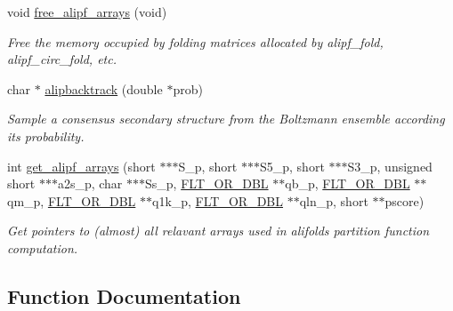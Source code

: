 \begin{DoxyCompactItemize}
void \mbox{\hyperlink{group__part__func__global__deprecated_ga0c0498f35686e26b38ee460d3db1a661}{free\+\_\+alipf\+\_\+arrays}} (void)
\begin{DoxyCompactList}\small\item\em Free the memory occupied by folding matrices allocated by alipf\+\_\+fold, alipf\+\_\+circ\+\_\+fold, etc. \end{DoxyCompactList}\item 
char $\ast$ \mbox{\hyperlink{group__part__func__global__deprecated_ga0df40248788f0fb17ebdc59d74116d1c}{alipbacktrack}} (double $\ast$prob)
\begin{DoxyCompactList}\small\item\em Sample a consensus secondary structure from the Boltzmann ensemble according its probability. \end{DoxyCompactList}\item 
int \mbox{\hyperlink{group__part__func__global__deprecated_ga5349960075b1847720a2e9df021e2675}{get\+\_\+alipf\+\_\+arrays}} (short $\ast$$\ast$$\ast$S\+\_\+p, short $\ast$$\ast$$\ast$S5\+\_\+p, short $\ast$$\ast$$\ast$S3\+\_\+p, unsigned short $\ast$$\ast$$\ast$a2s\+\_\+p, char $\ast$$\ast$$\ast$Ss\+\_\+p, \mbox{\hyperlink{group__data__structures_ga31125aeace516926bf7f251f759b6126}{F\+L\+T\+\_\+\+O\+R\+\_\+\+D\+BL}} $\ast$$\ast$qb\+\_\+p, \mbox{\hyperlink{group__data__structures_ga31125aeace516926bf7f251f759b6126}{F\+L\+T\+\_\+\+O\+R\+\_\+\+D\+BL}} $\ast$$\ast$qm\+\_\+p, \mbox{\hyperlink{group__data__structures_ga31125aeace516926bf7f251f759b6126}{F\+L\+T\+\_\+\+O\+R\+\_\+\+D\+BL}} $\ast$$\ast$q1k\+\_\+p, \mbox{\hyperlink{group__data__structures_ga31125aeace516926bf7f251f759b6126}{F\+L\+T\+\_\+\+O\+R\+\_\+\+D\+BL}} $\ast$$\ast$qln\+\_\+p, short $\ast$$\ast$pscore)
\begin{DoxyCompactList}\small\item\em Get pointers to (almost) all relavant arrays used in alifold\textquotesingle{}s partition function computation. \end{DoxyCompactList}\end{DoxyCompactItemize}


\subsection{Function Documentation}
\mbox{\label{group__part__func__global__deprecated_gab46954fb0ed3b6d5631e7f9b802978cd}} 
